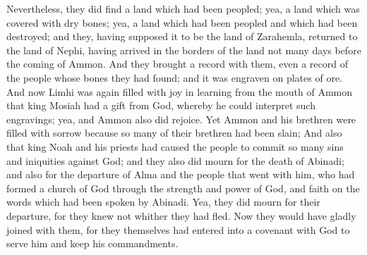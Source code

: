 Nevertheless, they did find a land which had been peopled; yea, a land which was covered with dry bones; yea, a land which had been peopled and which had been destroyed; and they, having supposed it to be the land of Zarahemla, returned to the land of Nephi, having arrived in the borders of the land not many days before the coming of Ammon.
\bverse \iffalse And they brought a record with them, even a record of the people whose bones they had found; and it was engraven on plates of ore. \fi
And they brought a record with them, even a record of the people whose bones they had found; and it was engraven on plates of ore.
\bverse \iffalse And now Limhi was again filled with joy in learning from the mouth of Ammon that king Mosiah had a gift from God, whereby he could interpret such engravings; yea, and Ammon also did rejoice. \fi
And now Limhi was again filled with joy in learning from the mouth of Ammon that king Mosiah had a gift from God, whereby he could interpret such engravings; yea, and Ammon also did rejoice.
\bverse \iffalse Yet Ammon and his brethren were filled with sorrow because so many of their brethren had been slain; \fi
Yet Ammon and his brethren were filled with sorrow because so many of their brethren had been slain;
\bverse \iffalse And also that king Noah and his priests had caused the people to commit so many sins and iniquities against God; and they also did mourn for the death of Abinadi; and also for the departure of Alma and the people that went with him, who had formed a church of God through the strength and power of God, and faith on the words which had been spoken by Abinadi. \fi
And also that king Noah and his priests had caused the people to commit so many sins and iniquities against God; and they also did mourn for the death of Abinadi; and also for the departure of Alma and the people that went with him, who had formed a church of God through the strength and power of God, and faith on the words which had been spoken by Abinadi.
\bverse \iffalse Yea, they did mourn for their departure, for they knew not whither they had fled. Now they would have gladly joined with them, for they themselves had entered into a covenant with God to serve him and keep his commandments. \fi
Yea, they did mourn for their departure, for they knew not whither they had fled. Now they would have gladly joined with them, for they themselves had entered into a covenant with God to serve him and keep his commandments.
\bverse \iffalse And now since the coming of Ammon, king Limhi had also entered into a covenant with God, and also many of his people, to serve him and keep his commandments. \fi
